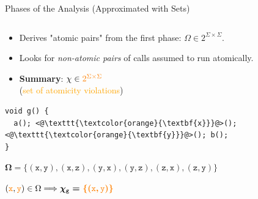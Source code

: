 \documentclass[10pt, xcolor=pdflatex, hyperref={unicode}, aspectratio=169]{beamer}
\begin{document}
\begin{frame}[fragile]{Phases of the Analysis (Approximated with Sets)}
\begin{columns}
\begin{column}
            \begin{itemize}
                \item Derives "\alert{atomic pairs}" from the first phase: $ \Omega \in 2^{\Sigma \times \Sigma} $.

                \item Looks for \emph{non-atomic pairs} of calls assumed to \alert{run atomically}.

                \item \textbf{Summary}: $ \chi \in \textcolor{orange}{2^{\Sigma \times \Sigma}} $ \\
                    (\textcolor{orange}{set of atomicity violations})
            \end{itemize}

            \hfill

\begin{lstlisting}
void g() {
  a(); <@\texttt{\textcolor{orange}{\textbf{x}}}@>(); <@\texttt{\textcolor{orange}{\textbf{y}}}@>(); b();
}
\end{lstlisting}

            \hfill

            \centering
            \footnotesize

            $ \boldsymbol{\Omega = \{(\mathtt{x, y}), (\mathtt{x, z}), (\mathtt{y, x}), (\mathtt{y, z}), (\mathtt{z, x}), (\mathtt{z, y})\}} $

            \smallskip

            $ (\mathtt{\textcolor{orange}{\boldsymbol{\mathtt{x}}}, \textcolor{orange}{\boldsymbol{\mathtt{y}}}}) \in \Omega \Longrightarrow \boldsymbol{\chi_\mathtt{g} = \textcolor{orange}{\{(\mathtt{x, y})\}}} $
        \end{column}
    \end{columns}
\end{frame}


\end{document}
